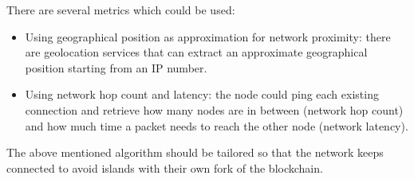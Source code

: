 There are several metrics which could be used:

\begin{itemize}
	\item Using geographical position as approximation for network proximity: there are geolocation services that can extract an approximate geographical position starting from an IP number.
          \item Using network hop count and latency: the node could ping each existing connection and retrieve how many nodes are in between (network hop count) and how much time a packet needs to reach the other node (network latency).
\end{itemize}

The above mentioned algorithm should be tailored so that the network keeps connected to avoid islands with their own fork of the blockchain.

